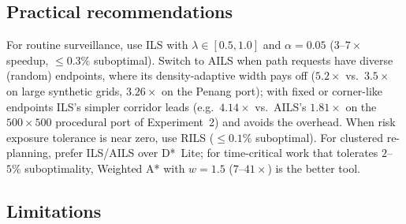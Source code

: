 \documentclass[preprint,12pt,authoryear]{elsarticle}
\begin{document}
\subsection{Practical recommendations}\label{subsec:practical}

For routine surveillance, use ILS with $\lambda \in [0.5, 1.0]$ and $\alpha = 0.05$ ($3$--$7\times$ speedup, $\leq 0.3\%$ suboptimal). Switch to AILS when path requests have diverse (random) endpoints, where its density-adaptive width pays off ($5.2\times$ vs.\ $3.5\times$ on large synthetic grids, $3.26\times$ on the Penang port); with fixed or corner-like endpoints ILS's simpler corridor leads (e.g.\ $4.14\times$ vs.\ AILS's $1.81\times$ on the $500\times500$ procedural port of Experiment~2) and avoids the overhead. When risk exposure tolerance is near zero, use RILS ($\leq 0.1\%$ suboptimal). For clustered re-planning, prefer ILS/AILS over D*~Lite; for time-critical work that tolerates $2$--$5\%$ suboptimality, Weighted A* with $w = 1.5$ ($7$--$41\times$) is the better tool.

\subsection{Limitations}
\end{document}
